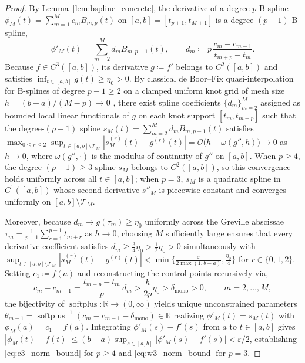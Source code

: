 \begin{proof}
By Lemma~\ref{lem:bspline_concrete}, the derivative of a degree-$p$ B-spline $\phi_M(t) = \sum_{m=1}^M c_m B_{m, p}(t)$ on $[a, b] = [t_{p+1}, t_{M+1}]$ is a degree-$(p-1)$ B-spline,
\begin{equation}
    \phi'_M(t) = \sum_{m=2}^M d_m B_{m, p-1}(t), \qquad d_m \coloneqq p\,\frac{c_m - c_{m-1}}{t_{m+p} - t_m}.
    \label{eq:deriv_spline_coeff_map}
\end{equation}
Because $f \in C^3([a, b])$, its derivative $g \coloneqq f'$ belongs to $C^2([a, b])$ and satisfies $\inf_{t \in [a, b]} g(t) \ge \eta_0 > 0$. By classical de Boor--Fix quasi-interpolation for B-splines of degree $p - 1 \ge 2$ on a clamped uniform knot grid of mesh size $h = (b - a)/(M - p) \to 0$ \cite{deboor1978practical}, there exist spline coefficients $\{d_m\}_{m=2}^M$ assigned as bounded local linear functionals of $g$ on each knot support $[t_m, t_{m+p}]$ such that the degree-$(p-1)$ spline $s_M(t) = \sum_{m=2}^M d_m B_{m, p-1}(t)$ satisfies $\max_{0 \le r \le 2} \sup_{t \in [a, b] \setminus \mathcal{T}_M} |s_M^{(r)}(t) - g^{(r)}(t)| = \mathcal{O}\big(h + \omega(g'', h)\big) \to 0$ as $h \to 0$, where $\omega(g'', \cdot)$ is the modulus of continuity of $g''$ on $[a, b]$. When $p \ge 4$, the degree-$(p-1) \ge 3$ spline $s_M$ belongs to $C^2([a, b])$, so this convergence holds uniformly across all $t \in [a, b]$; when $p = 3$, $s_M$ is a quadratic spline in $C^1([a, b])$ whose second derivative $s''_M$ is piecewise constant and converges uniformly on $[a, b] \setminus \mathcal{T}_M$.

Moreover, because $d_m \to g(\tau_m) \ge \eta_0$ uniformly across the Greville abscissae $\tau_m = \frac{1}{p-1}\sum_{r=1}^{p-1} t_{m+r}$ as $h \to 0$, choosing $M$ sufficiently large ensures that every derivative coefficient satisfies $d_m \ge \frac{3}{4}\eta_0 > \frac{1}{2}\eta_0 > 0$ simultaneously with $\sup_{t \in [a, b] \setminus \mathcal{T}_M} |s_M^{(r)}(t) - g^{(r)}(t)| < \min\big\{\frac{\varepsilon}{2\max(1, b-a)}, \frac{\eta_0}{4}\big\}$ for $r \in \{0, 1, 2\}$. Setting $c_1 \coloneqq f(a)$ and reconstructing the control points recursively via,
\begin{equation}
    c_m - c_{m-1} = \frac{t_{m+p} - t_m}{p}\,d_m > \frac{h}{2p}\eta_0 > \delta_{\text{mono}} > 0, \qquad m = 2, \dots, M,
\end{equation}
the bijectivity of $\operatorname{softplus}: \mathbb{R} \to (0, \infty)$ yields unique unconstrained parameters $\theta_{m-1} = \operatorname{softplus}^{-1}(c_m - c_{m-1} - \delta_{\text{mono}}) \in \mathbb{R}$ realizing $\phi'_M(t) = s_M(t)$ with $\phi_M(a) = c_1 = f(a)$. Integrating $\phi'_M(s) - f'(s)$ from $a$ to $t \in [a, b]$ gives $|\phi_M(t) - f(t)| \le (b - a)\sup_{s \in [a, b]} |\phi'_M(s) - f'(s)| < \varepsilon / 2$, establishing \eqref{eq:c3_norm_bound} for $p \ge 4$ and \eqref{eq:w3_norm_bound} for $p = 3$.
\end{proof}


